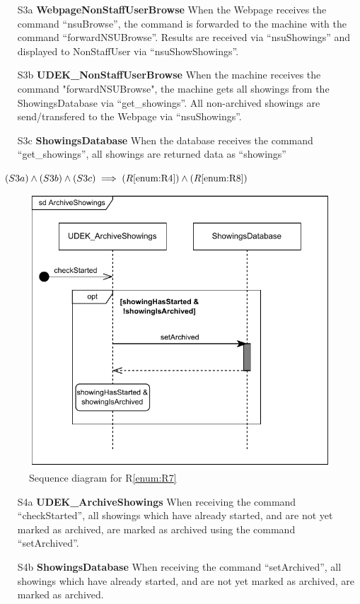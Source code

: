 \documentclass[a4paper,10pt,titlepage,bibtotoc,bibtotocnumbered]{scrreprt}
\begin{document}
\begin{itemize}
\item[S3a] \textbf{WebpageNonStaffUserBrowse}
When the Webpage receives the command ``nsuBrowse'', the command is forwarded to the machine with the command ``forwardNSUBrowse''.
Results are received via ``nsuShowings'' and displayed to NonStaffUser via ``nsuShowShowings''.

\item[S3b] \textbf{UDEK\_NonStaffUserBrowse}
When the machine receives the command "forwardNSUBrowse", the machine gets all showings from the ShowingsDatabase via ``get\_showings''.
All non-archived showings are send/transfered to the Webpage via ``nsuShowings''.

\item[S3c] \textbf{ShowingsDatabase}
When the database receives the command ``get\_showings'', all showings are returned data as ``showings''

\end{itemize}

$(S3a) \land (S3b) \land (S3c) \implies (R\ref{enum:R4}) \land (R\ref{enum:R8})$

\begin{figure}[H]
\centering
\includegraphics{figures/05/a05_sequence_diagram_r07.pdf}
\caption{Sequence diagram for R\ref{enum:R7}}
\label{figure:sdR7}
\end{figure}

\begin{itemize}
\item[S4a] \textbf{UDEK\_ArchiveShowings}
When receiving the command ``checkStarted'', all showings which have already started, and are not yet marked as archived, are marked as archived using the command ``setArchived''.

\item[S4b] \textbf{ShowingsDatabase}
When receiving the command ``setArchived'', all showings which have already started, and are not yet marked as archived, are marked as archived.

\end{itemize}
\end{document}
